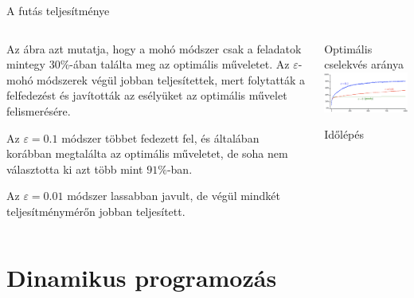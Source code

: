\documentclass[english, aspectratio=169]{beamer}
\makeatletter
\let\origtableofcontents=\tableofcontents
\def\tableofcontents{\@ifnextchar[{\origtableofcontents}{\gobbletableofcontents}}
\def\gobbletableofcontents#1{\origtableofcontents}
\makeatother
\begin{document}
\begin{frame}{A futás teljesítménye}
\begin{columns}
\begin{column}{.5\textwidth}
Az ábra azt mutatja, hogy a mohó módszer csak a feladatok mintegy $30\%$-ában találta meg az optimális műveletet. Az $\varepsilon$-mohó módszerek végül jobban teljesítettek, mert folytatták a felfedezést és javították az esélyüket az optimális művelet felismerésére. \par\smallskip
Az $\varepsilon=0.1$ módszer többet fedezett fel, és általában korábban megtalálta az optimális műveletet, de soha nem választotta ki azt több mint $91\%$-ban. \par\smallskip
Az $\varepsilon=0.01$ módszer lassabban javult, de végül mindkét teljesítménymérőn jobban teljesített.
\end{column}
\begin{column}{.5\textwidth}
\begin{center}
Optimális cselekvés aránya
\includegraphics[width=7cm, keepaspectratio]{images/solving_8.png}
\begin{scriptsize}
Időlépés
\end{scriptsize}
\end{center}
\end{column}
\end{columns}
\end{frame}

\section{Dinamikus programozás}

\begin{frame}
\tableofcontents[currentsection]
\end{frame}
\end{document}
